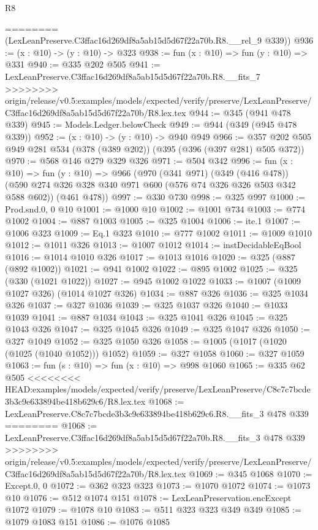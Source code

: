 \begin{lexlean}{R8}
\begin{coremodule}
{{{{{{{{{{{{{{{{{{{{{{{========
      (LexLeanPreserve.C3ffac16d269df8a5ab15d5d67f22a70b.R8.__rel_9 @339))
@936 := (x : @10) -> (y : @10) -> @323
@938 := fun (x : @10) => fun (y : @10) => @331
@940 := @335 @202 @505
@941 := LexLeanPreserve.C3ffac16d269df8a5ab15d5d67f22a70b.R8.__fits_7
>>>>>>>> origin/release/v0.5:examples/models/expected/verify/preserve/LexLeanPreserve/C3ffac16d269df8a5ab15d5d67f22a70b/R8.lex.tex
@944 := @345 (@941 @478 @339)
@945 := Models.Ledger.belowCheck
@949 := @944 (@349 (@945 @478 @339))
@952 := (x : @10) -> (y : @10) -> @940 @949
@966 := @357 @202 @505 @949 @281 @534 (@378 (@389 @202)) (@395 (@396 (@397 @281) @505 @372))
@970 := @568 @146 @279 @329 @326
@971 := @504 @342
@996 := fun (x : @10) =>
  fun (y : @10) =>
  @966
    (@970
      (@341 @971)
      (@349 (@416 @478))
      (@590 @274 @326 @328 @340 @971 @600 (@576 @74 @326 @326 @503 @342 @588 @602))
      (@461 @478))
@997 := @330 @730
@998 := @325 @997
@1000 := Prod.snd.{0, 0} @10
@1001 := @1000 @10
@1002 := @1001 @734
@1003 := @774 @1002
@1004 := @887 @1003
@1005 := @325 @1004
@1006 := ite.{1}
@1007 := @1006 @323
@1009 := Eq.{1} @323
@1010 := @777 @1002
@1011 := @1009 @1010
@1012 := @1011 @326
@1013 := @1007 @1012
@1014 := instDecidableEqBool
@1016 := @1014 @1010 @326
@1017 := @1013 @1016
@1020 := @325 (@887 (@892 @1002))
@1021 := @941 @1002
@1022 := @895 @1002
@1025 := @325 (@330 (@1021 @1022))
@1027 := @945 @1002 @1022
@1033 := @1007 (@1009 @1027 @326) (@1014 @1027 @326)
@1034 := @887 @326
@1036 := @325 @1034 @326
@1037 := @327 @1036
@1039 := @325 @1037 @326
@1040 := @1033 @1039
@1041 := @887 @1034
@1043 := @325 @1041 @326
@1045 := @325 @1043 @326
@1047 := @325 @1045 @326
@1049 := @325 @1047 @326
@1050 := @327 @1049
@1052 := @325 @1050 @326
@1058 := @1005 (@1017 (@1020 (@1025 (@1040 @1052))) @1052)
@1059 := @327 @1058
@1060 := @327 @1059
@1063 := fun (s : @10) => fun (x : @10) => @998 @1060
@1065 := @335 @62 @505
<<<<<<<< HEAD:examples/models/expected/verify/preserve/LexLeanPreserve/C8c7c7bcde3b3c9e633894be418b629c6/R8.lex.tex
@1068 := LexLeanPreserve.C8c7c7bcde3b3c9e633894be418b629c6.R8.__fits_3 @478 @339
========
@1068 := LexLeanPreserve.C3ffac16d269df8a5ab15d5d67f22a70b.R8.__fits_3 @478 @339
>>>>>>>> origin/release/v0.5:examples/models/expected/verify/preserve/LexLeanPreserve/C3ffac16d269df8a5ab15d5d67f22a70b/R8.lex.tex
@1069 := @345 @1068
@1070 := Except.{0, 0}
@1072 := @362 @323 @323
@1073 := @1070 @1072
@1074 := @1073 @10
@1076 := @512 @1074 @151
@1078 := LexLeanPreservation.encExcept @1072
@1079 := @1078 @10
@1083 := @511 @323 @323 @349 @349
@1085 := @1079 @1083 @151
@1086 := @1076 @1085
}}}}}}}}}}}}}}}}}}}}}}}
\end{coremodule}
\end{lexlean}
